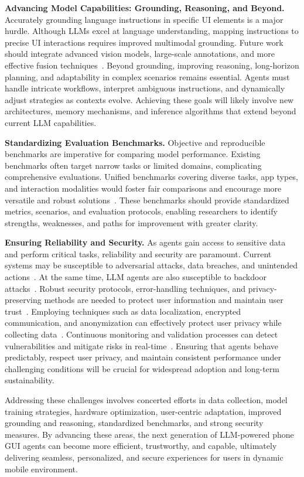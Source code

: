 \noindent\textbf{Advancing Model Capabilities: Grounding, Reasoning, and Beyond.}
Accurately grounding language instructions in specific UI elements is a major hurdle. Although LLMs excel at language understanding, mapping instructions to precise UI interactions requires improved multimodal grounding. Future work should integrate advanced vision models, large-scale annotations, and more effective fusion techniques~\cite{gou2024navigating, cheng2024seeclick, you2024ferret, zhang2024ui-hawk}.
Beyond grounding, improving reasoning, long-horizon planning, and adaptability in complex scenarios remains essential. Agents must handle intricate workflows, interpret ambiguous instructions, and dynamically adjust strategies as contexts evolve. Achieving these goals will likely involve new architectures, memory mechanisms, and inference algorithms that extend beyond current LLM capabilities.


\noindent\textbf{Standardizing Evaluation Benchmarks.}
Objective and reproducible benchmarks are imperative for comparing model performance. Existing benchmarks often target narrow tasks or limited domains, complicating comprehensive evaluations. Unified benchmarks covering diverse tasks, app types, and interaction modalities would foster fair comparisons and encourage more versatile and robust solutions~\cite{wang2024mobileagentbench, xu2024androidlab, lu2024guiodyssey, rawles2024androidinthewild}.
These benchmarks should provide standardized metrics, scenarios, and evaluation protocols, enabling researchers to identify strengths, weaknesses, and paths for improvement with greater clarity.


\noindent\textbf{Ensuring Reliability and Security.}
As agents gain access to sensitive data and perform critical tasks, reliability and security are paramount. Current systems may be susceptible to adversarial attacks, data breaches, and unintended actions~\cite{wu2024adversarial}. At the same time, LLM agents are also susceptible to backdoor attacks~\cite{yang2024watch,wang2024badagent}. Robust security protocols, error-handling techniques, and privacy-preserving methods are needed to protect user information and maintain user trust~\cite{ma2024coco,bai2024digirl}. Employing techniques such as data localization, encrypted communication, and anonymization can effectively protect user privacy while collecting data~\cite{wang2025fedmobileagent}.
Continuous monitoring and validation processes can detect vulnerabilities and mitigate risks in real-time~\cite{lee2023exploremobilegpt}. Ensuring that agents behave predictably, respect user privacy, and maintain consistent performance under challenging conditions will be crucial for widespread adoption and long-term sustainability.


Addressing these challenges involves concerted efforts in data collection, model training strategies, hardware optimization, user-centric adaptation, improved grounding and reasoning, standardized benchmarks, and strong security measures. By advancing these areas, the next generation of LLM-powered phone GUI agents can become more efficient, trustworthy, and capable, ultimately delivering seamless, personalized, and secure experiences for users in dynamic mobile environment.
